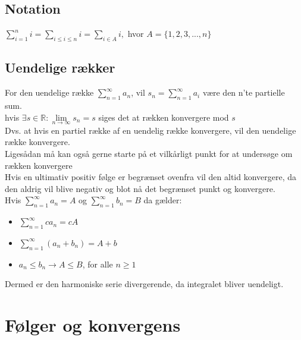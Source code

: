 \documentclass[12pt, a4paper]{article}
\begin{document}
	\subsection{Notation}
		$\sum\limits_{i=1}^{n}i=\sum\limits_{i\leq i\leq n}i=\sum\limits_{i\in A}i,$ hvor $A=\{1,2,3,...,n\}$
	\subsection{Uendelige rækker}
		For den uendelige række $\sum\limits_{n=1}^{\infty}a_n$, vil $s_n=\sum\limits_{n=1}^{\infty}a_i$ være den n'te partielle sum.\\
		hvis $\exists s\in \mathbb{R}: \lim\limits_{n\rightarrow \infty}s_n=s$ siges det at rækken konvergere mod $s$\\
		Dvs. at hvis en partiel række af en uendelig række konvergere, vil den uendelige række konvergere.\\
		Ligesådan må kan også gerne starte på et vilkårligt punkt for at undersøge om rækken konvergere\\[4mm]
		Hvis en ultimativ positiv følge er begrænset ovenfra vil den altid konvergere, da den aldrig vil blive negativ og blot nå det begrænset punkt og konvergere.\\
		Hvis $\sum\limits_{n=1}^{\infty}a_n=A$ og $\sum\limits_{n=1}^{\infty}b_n=B$ da gælder:
		\begin{itemize}
			\item $\sum\limits_{n=1}^{\infty}ca_n=cA$
			\item $\sum\limits_{n=1}^{\infty}(a_n+b_n)=A+b$
			\item $a_n\leq b_n \rightarrow A\leq B$, for alle $n\geq 1$
		\end{itemize}
		
			Dermed er den harmoniske serie divergerende, da integralet bliver uendeligt.
	
		
\section{Følger og konvergens}
\end{document}
